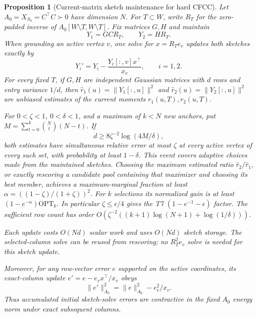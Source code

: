 \documentclass[11pt]{article}
\newtheorem{proposition}[theorem]{Proposition}
\begin{document}
\begin{proposition}[Current-matrix sketch maintenance for hard CFCC]
\label{prop:maintainedsketch}
Let $A_0=X_{S_0}=C^\top C\succ0$ have dimension $N$.
For $T\subset W$, write $R_T$ for the zero-padded inverse of
$A_0[W\setminus T,W\setminus T]$. Fix matrices $G,H$ and maintain
\[
 Y_1=GCR_T,\qquad Y_2=HR_T.
\]
When grounding an active vertex $v$, one solve for $x=R_Te_v$
updates both sketches exactly by
\[
 Y_i' =Y_i-\frac{Y_i[:,v]x^\top}{x_v},\qquad i=1,2.
\]
For every fixed $T$, if $G,H$ are independent Gaussian matrices
with $d$ rows and entry variance $1/d$, then
$\widehat r_1(u)=\|Y_1[:,u]\|^2$ and
$\widehat r_2(u)=\|Y_2[:,u]\|^2$ are unbiased estimates of the
\emph{current} moments $r_1(u,T),r_2(u,T)$.

For $0<\zeta<1$, $0<\delta<1$, and a maximum of $k<N$ new anchors,
put $M=\sum_{t=0}^k\binom Nt(N-t)$. If
\[
 d\geq8\zeta^{-2}\log(4M/\delta),
\]
both estimates have simultaneous relative error at most $\zeta$
at every active vertex of every such set, with probability at
least $1-\delta$. This event covers adaptive choices made from
the maintained sketches. Choosing the maximum estimated ratio
$\widehat r_2/\widehat r_1$, or exactly rescoring a candidate
pool containing that maximizer and choosing its best member,
achieves a maximum-marginal fraction at least
$\alpha=((1-\zeta)/(1+\zeta))^2$. For $k$ selections its
normalized gain is at least $(1-e^{-\alpha})\mathrm{OPT}_k$.
In particular $\zeta\leq\epsilon/4$ gives the T7
$(1-e^{-1}-\epsilon)$ factor. The sufficient row count has order
$O(\zeta^{-2}((k+1)\log(N+1)+\log(1/\delta)))$.

Each update costs $O(Nd)$ scalar work and uses $O(Nd)$ sketch
storage. The selected-column solve can be reused from rescoring;
no $R_T^2e_v$ solve is needed for this sketch update.

Moreover, for any row-vector error $e$ supported on the active
coordinates, its exact-column update $e'=e-e_vx^\top/x_v$ obeys
\[
 \|e'\|_{A_0}^2=\|e\|_{A_0}^2-e_v^2/x_v.
\]
Thus accumulated initial sketch-solve errors are contractive in
the fixed $A_0$ energy norm under exact subsequent columns.
\end{proposition}
\end{document}
